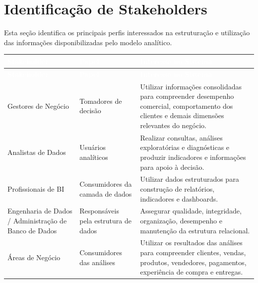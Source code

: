 \documentclass[12pt,a4paper]{article}
\begin{document}
\section{Identificação de Stakeholders}

Esta seção identifica os principais perfis interessados na estruturação e utilização das informações disponibilizadas pelo modelo analítico.

\vspace{0.5cm}

\renewcommand{\arraystretch}{1.15}
\begin{longtable}{
|>{\RaggedRight\arraybackslash}p{3.7cm}
|>{\RaggedRight\arraybackslash}p{3.7cm}
|>{\RaggedRight\arraybackslash}p{6.9cm}|}
    \hline
    \rowcolor{AzulCorporativo}
    \textcolor{white}{\textbf{Stakeholder}} &
    \textcolor{white}{\textbf{Papel}} &
    \textcolor{white}{\textbf{Interesse no Sistema}} \\ \hline
    \endfirsthead

    \hline
    \rowcolor{AzulCorporativo}
    \textcolor{white}{\textbf{Stakeholder}} &
    \textcolor{white}{\textbf{Papel}} &
    \textcolor{white}{\textbf{Interesse no Sistema}} \\ \hline
    \endhead

    Gestores de Negócio &
    Tomadores de decisão &
    Utilizar informações consolidadas para compreender desempenho comercial, comportamento dos clientes e demais dimensões relevantes do negócio. \\ \hline

    Analistas de Dados &
    Usuários analíticos &
    Realizar consultas, análises exploratórias e diagnósticas e produzir indicadores e informações para apoio à decisão. \\ \hline

    Profissionais de BI &
    Consumidores da camada de dados &
    Utilizar dados estruturados para construção de relatórios, indicadores e dashboards. \\ \hline

    Engenharia de Dados / Administração de Banco de Dados &
    Responsáveis pela estrutura de dados &
    Assegurar qualidade, integridade, organização, desempenho e manutenção da estrutura relacional. \\ \hline

    Áreas de Negócio &
    Consumidores das análises &
    Utilizar os resultados das análises para compreender clientes, vendas, produtos, vendedores, pagamentos, experiência de compra e entregas. \\ \hline
\end{longtable}
\end{document}
